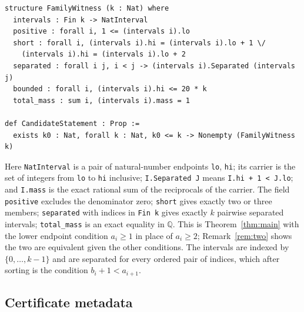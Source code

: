 \documentclass[11pt,letterpaper]{article}
\numberwithin{equation}{section}
\theoremstyle{plain}
\theoremstyle{remark}
\newcommand{\Q}{\mathbb Q}
\begin{document}
\begin{verbatim}
structure FamilyWitness (k : Nat) where
  intervals : Fin k -> NatInterval
  positive : forall i, 1 <= (intervals i).lo
  short : forall i, (intervals i).hi = (intervals i).lo + 1 \/
    (intervals i).hi = (intervals i).lo + 2
  separated : forall i j, i < j -> (intervals i).Separated (intervals j)
  bounded : forall i, (intervals i).hi <= 20 * k
  total_mass : sum i, (intervals i).mass = 1

def CandidateStatement : Prop :=
  exists k0 : Nat, forall k : Nat, k0 <= k -> Nonempty (FamilyWitness k)
\end{verbatim}

Here \texttt{NatInterval} is a pair of natural-number endpoints \texttt{lo}, \texttt{hi}; its carrier is the set of integers from \texttt{lo} to \texttt{hi} inclusive; \texttt{I.Separated J} means \texttt{I.hi + 1 < J.lo}; and \texttt{I.mass} is the exact rational sum of the reciprocals of the carrier. The field \texttt{positive} excludes the denominator zero; \texttt{short} gives exactly two or three members; \texttt{separated} with indices in \texttt{Fin k} gives exactly $k$ pairwise separated intervals; \texttt{total\_mass} is an exact equality in $\Q$. This is Theorem~\ref{thm:main} with the lower endpoint condition $a_i\ge1$ in place of $a_i\ge2$; Remark~\ref{rem:two} shows the two are equivalent given the other conditions. The intervals are indexed by $\{0,\ldots,k-1\}$ and are separated for every ordered pair of indices, which after sorting is the condition $b_i+1<a_{i+1}$.

\subsection{Certificate metadata}\label{app:meta}
\end{document}
